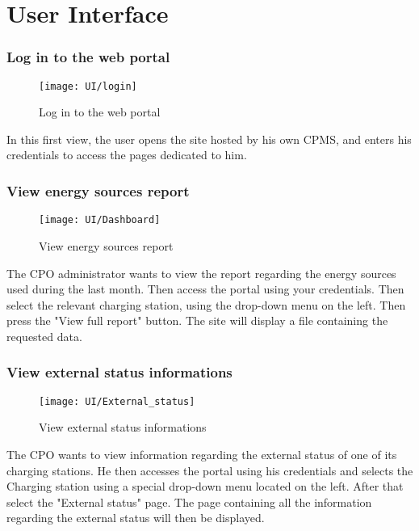 \chapter{User Interface}


\subsection{Log in to the web portal}
\begin{figure}[h]
\texttt{[image: UI/login]}
\caption{Log in to the web portal}
\end{figure}
In this first view, the user opens the site hosted by his own CPMS, and enters his credentials to access the pages dedicated to him.

\pagebreak

\subsection{View energy sources report}
\begin{figure}[h]
\texttt{[image: UI/Dashboard]}
\caption{View energy sources report}
\end{figure}
The CPO administrator wants to view the report regarding the energy sources used during the last month. Then access the portal using your credentials. Then select the relevant charging station, using the drop-down menu on the left. Then press the "View full report" button. The site will display a file containing the requested data.\\


\pagebreak
\subsection{View external status informations}
\begin{figure}[h]
\texttt{[image: UI/External\_status]}
\caption{View external status informations}
\end{figure}
The CPO wants to view information regarding the external status of one of its charging stations. He then accesses the portal using his credentials and selects the Charging station using a special drop-down menu located on the left. After that select the "External status" page. The page containing all the information regarding the external status will then be displayed.
\clearpage
